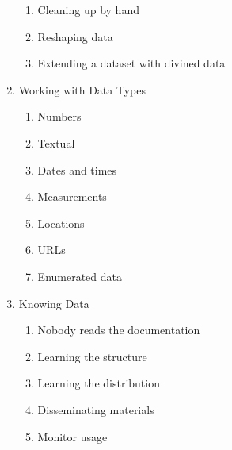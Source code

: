 \begin{enumerate}
\begin{enumerate}
    \item Cleaning up by hand
    \item Reshaping data
    \item Extending a dataset with divined data
    \end{enumerate}
\item Working with Data Types
    \begin{enumerate}
    \item Numbers
    \item Textual
    \item Dates and times
    \item Measurements
    \item Locations
    \item URLs
    \item Enumerated data
    \end{enumerate}
\item Knowing Data
	\begin{enumerate}
    \item Nobody reads the documentation
    \item Learning the structure
    \item Learning the distribution
    \item Disseminating materials
    \item Monitor usage
    \end{enumerate}
\end{enumerate}